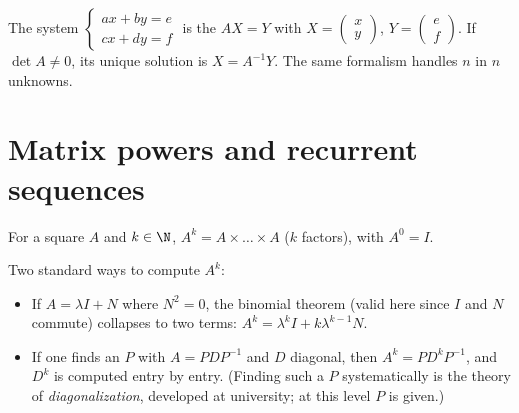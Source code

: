\begin{method}\label{met:g12:matrix:systems}
The system
$\begin{cases} ax + by = e\\ cx + dy = f \end{cases}$
is the   $AX = Y$ with
$X = \begin{pmatrix} x \\ y\end{pmatrix}$,
$Y = \begin{pmatrix} e \\ f\end{pmatrix}$. If $\det A \neq 0$, its unique
solution is $X = A^{-1}Y$. The same formalism handles $n$  in $n$
unknowns.
\end{method}

\section{Matrix powers and recurrent sequences}

\begin{definition}\label{def:g12:matrix:power}
For a square  $A$ and $k \in \N$, $A^k = A \times \dots \times A$
($k$ factors), with $A^0 = I$.
\end{definition}

\begin{method}\label{met:g12:matrix:powers}
Two standard ways to compute $A^k$:
\begin{itemize}
  \item If $A = \lambda I + N$ where $N^2 = 0$, the binomial theorem
        (valid here since $I$ and $N$ commute) collapses to two terms:
        $A^k = \lambda^k I + k \lambda^{k-1} N$.
  \item If one finds an  $P$ with $A = PDP^{-1}$ and $D$ diagonal,
        then $A^k = P D^k P^{-1}$, and $D^k$ is computed entry by entry.
        (Finding such a $P$ systematically is the theory of
        \emph{diagonalization}, developed at university; at this level $P$ is
        given.)
\end{itemize}
\end{method}

